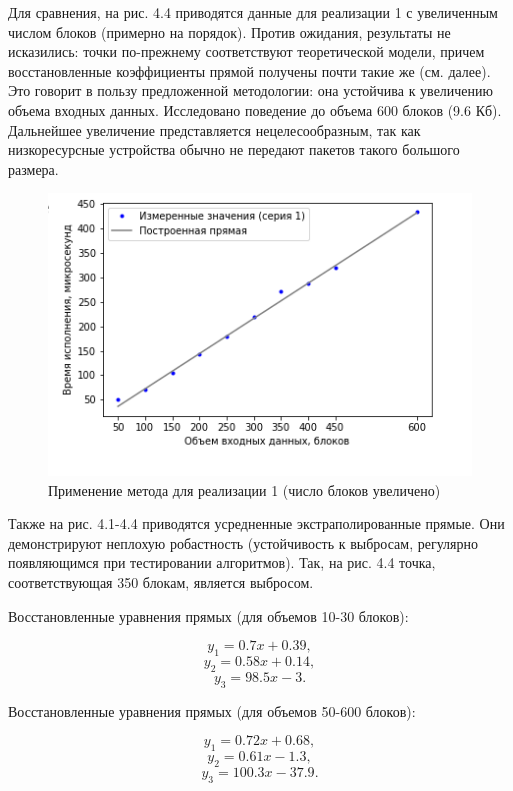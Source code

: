 Для сравнения, на рис. 4.4 приводятся данные для реализации 1 с увеличенным числом блоков (примерно на порядок). Против ожидания, результаты не исказились: точки по-прежнему соответствуют теоретической модели, причем восстановленные коэффициенты прямой получены почти такие же (см. далее). Это говорит в пользу предложенной методологии: она устойчива к увеличению объема входных данных. Исследовано поведение до объема 600 блоков (9.6 Кб). Дальнейшее увеличение представляется нецелесообразным, так как низкоресурсные устройства обычно не передают пакетов такого большого размера.

\begin{figure}[ht!] 
	\includegraphics [scale=0.9] {my_folder/plots//plot4}
	\centering
	\caption{Применение метода для реализации 1 (число блоков увеличено)} 
\end{figure}

Также на рис. 4.1-4.4 приводятся усредненные экстраполированные прямые. Они демонстрируют неплохую робастность (устойчивость к выбросам, регулярно появляющимся при тестировании алгоритмов). Так, на рис. 4.4 точка, соответствующая 350 блокам, является выбросом.

Восстановленные уравнения прямых (для объемов 10-30 блоков):

\begin{equation}
y_1 = 0.7x + 0.39,
\end{equation}
\begin{equation}
y_2 = 0.58x + 0.14,
\end{equation}
\begin{equation}
y_3 = 98.5x - 3.
\end{equation}

Восстановленные уравнения прямых (для объемов 50-600 блоков):

\begin{equation}
y_1 = 0.72x + 0.68,
\end{equation}
\begin{equation}
y_2 = 0.61x - 1.3,
\end{equation}
\begin{equation}
y_3 = 100.3x - 37.9.
\end{equation}

